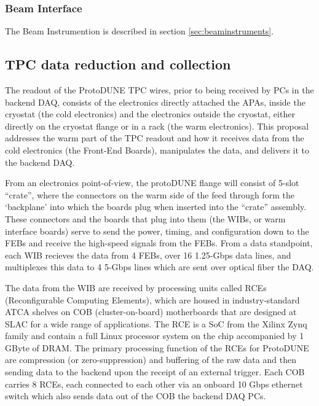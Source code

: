 
\subsubsection{Beam Interface}

The Beam Instrumention is described in section \ref{sec:beaminstruments}.

\subsection{TPC data reduction and collection}


The readout of the ProtoDUNE TPC wires, prior to being received by PCs in
the backend DAQ, consists of the electronics directly attached the APAs,
inside the cryostat (the cold electronics) and the electronics outside
the cryostat, either directly on the cryostat flange or in a rack (the
warm electronics).  This proposal addresses the warm part of the TPC
readout and how it receives data from the cold electronics (the Front-End
Boards), manipulates the data, and delivers it to the backend DAQ.

From an electronics point-of-view, the protoDUNE flange will consist of
5-slot ``crate'', where the connectors on the warm side of the feed
through form the ‘backplane’ into which the boards plug when inserted
into the ``crate'' assembly.  These connectors and the boards that plug
into them (the WIBs, or warm interface boards) serve to send the power,
timing, and configuration down to the FEBs and receive the high-speed
signals from the FEBs. From a data standpoint, each WIB recieves the
data from 4 FEBs, over 16 1.25-Gbps data lines, and multiplexes this
data to 4 5-Gbps lines which are sent over optical fiber the DAQ.

The data from the WIB are received by processing units called RCEs
(Reconfigurable Computing Elements), which are housed in industry-standard
ATCA shelves on COB (cluster-on-board) motherboards that are designed
at SLAC for a wide range of applications.   The RCE is a SoC from the
Xilinx Zynq family and contain a full Linux processor system on the chip
accompanied by 1 GByte of DRAM.   The primary processing function of the
RCEs for ProtoDUNE are compression (or zero-suppression) and buffering
of the raw data and then sending data to the backend upon the receipt of
an external trigger.  Each COB carries 8 RCEs, each connected to each
other via an onboard 10 Gbps ethernet switch which also sends data out
of the COB the backend DAQ PCs.

